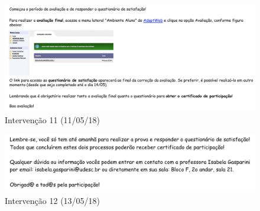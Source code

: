 \begin{figure}[htb]
  \caption{\label{fig:intervencao-11}Intervenção 11 (11/05/18)}
  \begin{center}
      \includegraphics[scale=0.6]{./Figuras/intervencao-11.png}
  \end{center}
\end{figure}

\begin{figure}[htb]
  \caption{\label{fig:intervencao-12}Intervenção 12 (13/05/18)}
  \begin{center}
      \includegraphics[scale=0.6]{./Figuras/intervencao-12.png}
  \end{center}
\end{figure}
